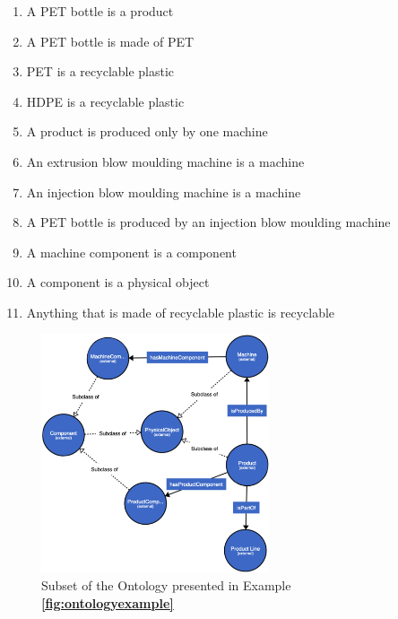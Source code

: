 \documentclass{guideline/sty/rapport}
\begin{document}
\begin{mdframed}[backgroundcolor=arsenic!8, linecolor=arsenic]
\begin{minipage}[t]{1\linewidth}
  \begin{enumerate}
    \item A PET bottle is a product \label{ax:1}
    \item A PET bottle is made of PET \label{ax:2}
    \item PET is a recyclable plastic \label{ax:3}
     \item HDPE is a recyclable plastic \label{ax:4}
    \item A product is produced only by one machine \label{ax:5}
    \item An extrusion blow moulding machine is a machine \label{ax:6}
    \item An injection blow moulding machine is a machine \label{ax:7}
    \item A PET bottle is produced by an injection blow moulding machine \label{ax:8}
    \item A machine component is a component \label{ax:9}
    \item A component is a physical object \label{ax:10}
    \item Anything that is made of recyclable plastic is recyclable \label{ax:11}
  \end{enumerate}
\end{minipage}
\end{mdframed}

\begin{figure}[H]
    \begin{minipage}{\textwidth}
            \centering
         \includegraphics[width=0.6\textwidth]{images/examplesCWAOWA.png}
    \end{minipage}%
    \caption{Subset of the Ontology presented in Example \textbf{\ref{fig:ontologyexample}}} \label{fig:examplesCWAOWA}
\end{figure}
\end{document}
